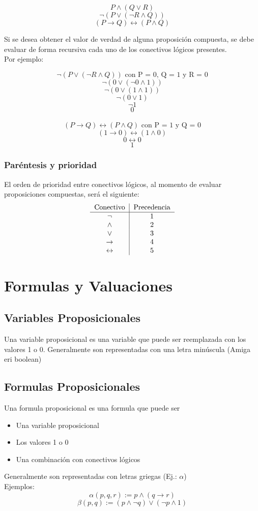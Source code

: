 \documentclass[../main.tex]{subfiles}
\begin{document}
$$P \wedge (Q \vee{} R)$$
$$\neg(P \vee (\neg{}R \wedge{} Q))$$
$$(P \rightarrow{} Q) \leftrightarrow{} (P \wedge{} Q)$$



Si se desea obtener el valor de verdad de alguna proposición compuesta, se debe evaluar de forma recursiva cada uno de los conectivos lógicos presentes.\\
Por ejemplo:

$$\neg(P \vee (\neg{} R \wedge{} Q)) \textrm{ con P = 0, Q = 1 y R = 0}$$
$$\neg(0 \vee (\neg{} 0 \wedge{} 1))$$
$$\neg(0 \vee (1 \wedge{} 1))$$
$$\neg(0 \vee 1)$$
$$\neg{}1$$
$$0$$
\\
$$(P \rightarrow{} Q) \leftrightarrow{} (P \wedge{} Q) \text{ con P = 1 y Q = 0}$$
$$(1 \rightarrow{} 0) \leftrightarrow{} (1 \wedge{} 0)$$
$$0 \leftrightarrow{} 0$$
$$1$$

\subsubsection{Paréntesis y prioridad}
El orden de prioridad entre conectivos lógicos, al momento de evaluar proposiciones compuestas, será el siguiente:
\[
    \begin{tabular}{c|c}
        Conectivo & Precedencia\\ \hline
        $\neg$ & 1\\
        $\wedge$ & 2\\
        $\vee$ & 3\\
        $\rightarrow$ & 4\\
        $\leftrightarrow$ & 5
    \end{tabular}
\]

\section{Formulas y Valuaciones}
\subsection{Variables Proposicionales}
Una variable proposicional es una variable que puede ser reemplazada con los valores 1 o 0. Generalmente son representadas con una letra minúscula (Amiga eri boolean)

\subsection{Formulas Proposicionales}
Una formula proposicional es una formula que puede ser
\begin{itemize}
    \item Una variable proposicional
    \item Los valores 1 o 0
    \item Una combinación con conectivos lógicos
\end{itemize}
Generalmente son representadas con letras griegas (Ej.: $\alpha$)\\
Ejemplos:
$$\alpha{}(p,q,r) := p \wedge{}(q \rightarrow{} r)$$
$$\beta{}(p,q) := (p \wedge{} \neg{}q) \vee{} (\neg{}p \wedge{} 1)$$
\end{document}

